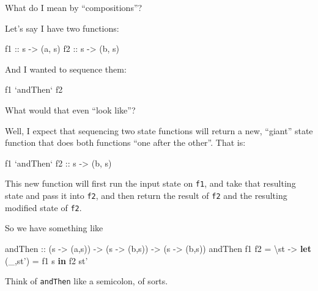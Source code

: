 \documentclass[]{article}
\newenvironment{Shaded}{}{}
\newcommand{\KeywordTok}[1]{\textcolor[rgb]{0.00,0.44,0.13}{\textbf{{#1}}}}
\newcommand{\OtherTok}[1]{\textcolor[rgb]{0.00,0.44,0.13}{{#1}}}
\newcommand{\FunctionTok}[1]{\textcolor[rgb]{0.02,0.16,0.49}{{#1}}}
\newcommand{\NormalTok}[1]{{#1}}
\begin{document}
What do I mean by ``compositions''?

Let's say I have two functions:

\begin{Shaded}
\begin{Highlighting}[]
\OtherTok{f1 ::} \NormalTok{s }\OtherTok{->} \NormalTok{(a, s)}
\OtherTok{f2 ::} \NormalTok{s }\OtherTok{->} \NormalTok{(b, s)}
\end{Highlighting}
\end{Shaded}

And I wanted to sequence them:

\begin{Shaded}
\begin{Highlighting}[]
\NormalTok{f1 }\OtherTok{`andThen`} \NormalTok{f2}
\end{Highlighting}
\end{Shaded}

What would that even ``look like''?

Well, I expect that sequencing two state functions will return a new, ``giant''
state function that does both functions ``one after the other''. That is:

\begin{Shaded}
\begin{Highlighting}[]
\NormalTok{f1 }\OtherTok{`andThen` f2 ::} \NormalTok{s }\OtherTok{->} \NormalTok{(b, s)}
\end{Highlighting}
\end{Shaded}

This new function will first run the input state on \texttt{f1}, and take that
resulting state and pass it into \texttt{f2}, and then return the result of
\texttt{f2} and the resulting modified state of \texttt{f2}.

So we have something like

\begin{Shaded}
\begin{Highlighting}[]
\OtherTok{andThen ::} \NormalTok{(s }\OtherTok{->} \NormalTok{(a,s)) }\OtherTok{->} \NormalTok{(s }\OtherTok{->} \NormalTok{(b,s)) }\OtherTok{->} \NormalTok{(s }\OtherTok{->} \NormalTok{(b,s))}
\NormalTok{andThen f1 f2 }\FunctionTok{=} \NormalTok{\textbackslash{}st }\OtherTok{->} \KeywordTok{let} \NormalTok{(_,st') }\FunctionTok{=} \NormalTok{f1 s}
                       \KeywordTok{in}  \NormalTok{f2 st'}
\end{Highlighting}
\end{Shaded}

Think of \texttt{andThen} like a semicolon, of sorts.
\end{document}
